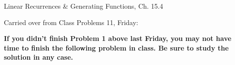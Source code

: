 \documentclass[handout]{mcs}
\begin{document}

\begin{staffnotes}
Linear Recurrences & Generating Functions, Ch. 15.4
\end{staffnotes}


Carried over from Class Problems 11, Friday:




\begin{center}
\textbf{\large If you didn't finish Problem 1 above last Friday, you
  may not have time to finish the following problem in class.  Be sure
  to study the solution in any case.}
\end{center}




\end{document}
